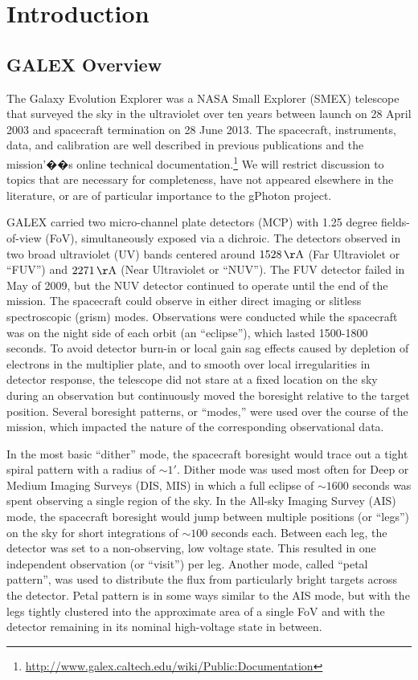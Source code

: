 \documentclass[preprint]{aastex}
\begin{document}
\section{Introduction}
\subsection{GALEX Overview}
The Galaxy Evolution Explorer \citep{mar2005} was a NASA Small Explorer (SMEX) telescope that surveyed the sky in the ultraviolet over ten years between launch on 28 April 2003 and spacecraft termination on 28 June 2013. The spacecraft, instruments, data, and calibration are well described in previous publications \citep{mor2005,mor2007} and the mission'��s online technical documentation.\footnote{\url{http://www.galex.caltech.edu/wiki/Public:Documentation}} We will restrict discussion to topics that are necessary for completeness, have not appeared elsewhere in the literature, or are of particular importance to the gPhoton project.

GALEX carried two micro-channel plate detectors (MCP) with 1.25 degree fields-of-view (FoV), simultaneously exposed via a dichroic. The detectors observed in two broad ultraviolet (UV) bands centered around $1528\,\rm{\AA}$ (Far Ultraviolet or ``FUV'') and $2271\,\rm{\AA}$ (Near Ultraviolet or ``NUV''). The FUV detector failed in May of 2009, but the NUV detector continued to operate until the end of the mission. The spacecraft could observe in either direct imaging or slitless spectroscopic (grism) modes. Observations were conducted while the spacecraft was on the night side of each orbit (an ``eclipse''), which lasted 1500-1800 seconds. To avoid detector burn-in or local gain sag effects caused by depletion of electrons in the multiplier plate, and to smooth over local irregularities in detector response, the telescope did not stare at a fixed location on the sky during an observation but continuously moved the boresight relative to the target position. Several boresight patterns, or ``modes,'' were used over the course of the mission, which impacted the nature of the corresponding observational data.

In the most basic ``dither'' mode, the spacecraft boresight would trace out a tight spiral pattern with a radius of $\sim1'$. Dither mode was used most often for Deep or Medium Imaging Surveys (DIS, MIS) in which a full eclipse of $\sim1600$ seconds was spent observing a single region of the sky. In the All-sky Imaging Survey (AIS) mode, the spacecraft boresight would jump between multiple positions (or ``legs'') on the sky for short integrations of $\sim100$ seconds each. Between each leg, the detector was set to a non-observing, low voltage state. This resulted in one independent observation (or ``visit'') per leg. Another mode, called ``petal pattern'', was used to distribute the flux from particularly bright targets across the detector. Petal pattern is in some ways similar to the AIS mode, but with the legs tightly clustered into the approximate area of a single FoV and with the detector remaining in its nominal high-voltage state in between.
\end{document}
